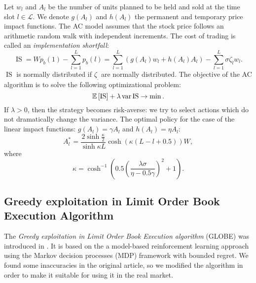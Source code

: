         Let $w_l$ and $A_l$ be the number of units planned to be held and sold at the time slot $l\in\mathcal L$.
        We denote $g(A_l)$ and $h(A_l)$ the permanent and temporary price impact functions.
        The AC model assumes that the stock price follows an arithmetic random walk with independent increments.
        The cost of trading is called an \emph{implementation shortfall}:
        \begin{equation*}
            \operatorname{IS} = Wp_b(1) - \sum_{l=1}^L p_b(l) = \sum_{l=1}^L \left(g(A_l)w_l + h(A_l)A_l\right) - \sum_{l=1}^L \sigma \zeta_lw_l.
        \end{equation*}
        $\operatorname{IS}$ is normally distributed if $\zeta_.$ are normally distributed. The objective of the AC algorithm is to solve the following optimizational problem:
        \begin{equation}\label{equation:ACtarget}
            \mathbb{E}\left[\operatorname{IS}\right] + \lambda \operatorname*{var} \operatorname{IS} \to \min.
        \end{equation}
        If $\lambda > 0$, then the strategy becomes risk-averse: we try to select actions which do not dramatically change the variance.
        The optimal policy for the case of the linear impact functions: $g(A_l) = \gamma A_l$ and $h(A_l) = \eta A_l$:
        \begin{equation*}
            A_l^* = \frac{2\sinh \frac{\kappa}{2}}{\sinh \kappa L}\cosh\left(\kappa (L-l+0.5)\right) W,
        \end{equation*}
        where
        \begin{equation*}
            \kappa = \cosh^{-1}\left(0.5\left(\frac{\lambda\sigma}{\eta - 0.5\gamma}\right)^2 + 1\right).
        \end{equation*}

    \subsection{Greedy exploitation in Limit Order Book Execution Algorithm}
        The \emph{Greedy exploitation in Limit Order Book Execution algorithm} (GLOBE) was introduced in \cite{Akbarzadeh2018}.
        It is based on the a model-based reinforcement learning approach using the Markov decision processes (MDP) framework with bounded regret. We found some inaccuracies in the original 
        article, so we modified the algorithm in order to make it suitable for using it in the real market.

